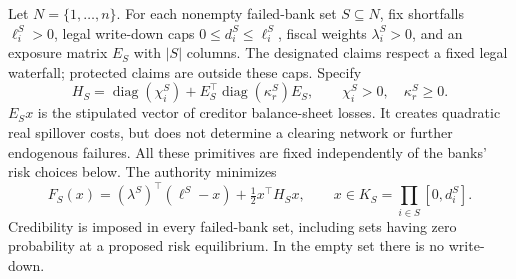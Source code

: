 \documentclass[11pt]{article}
\theoremstyle{definition}
\begin{document}
Let $N=\{1,\ldots,n\}$. For each nonempty failed-bank set $S\subseteq N$, fix
shortfalls $\ell^S_i>0$, legal write-down caps $0\leq d^S_i\leq\ell^S_i$,
fiscal weights $\lambda^S_i>0$, and an exposure matrix $E_S$ with $|S|$ columns.
The designated claims respect a fixed legal waterfall; protected claims are
outside these caps. Specify
\[
 H_S=\operatorname{diag}(\chi^S_i)+E_S^\top
           \operatorname{diag}(\kappa^S_r)E_S,
 \qquad \chi^S_i>0,\quad \kappa^S_r\geq0.
\]
$E_Sx$ is the stipulated vector of creditor balance-sheet losses. It creates
quadratic real spillover costs, but does not determine a clearing network or
further endogenous failures. All these primitives are fixed independently of
the banks' risk choices below. The authority minimizes
\[
 F_S(x)=(\lambda^S)^\top(\ell^S-x)+\tfrac12x^\top H_Sx,
 \qquad x\in K_S=\prod_{i\in S}[0,d^S_i].
\]
Credibility is imposed in every failed-bank set, including sets having zero
probability at a proposed risk equilibrium. In the empty set there is no
write-down.
\end{document}

